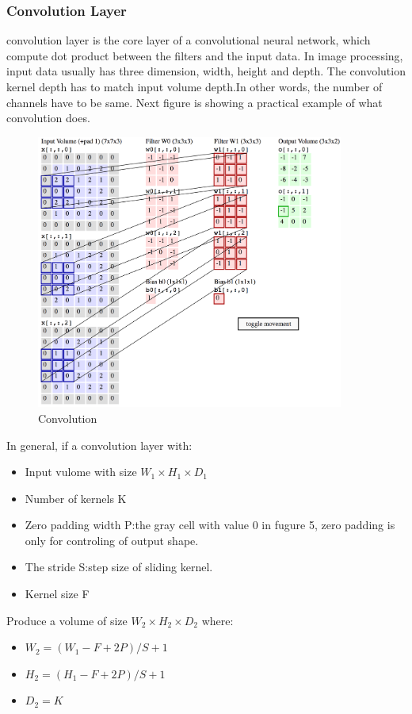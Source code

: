 \documentclass[12pt,a4paper]{report}
\begin{document}
\subsubsection{Convolution Layer}
convolution layer is the core layer of a convolutional neural network, which compute dot product between the filters and the input data. In image processing, input data usually has three dimension, width, height and depth. The convolution kernel depth has to match input volume	depth.In other words, the number of channels have to be same.	Next figure is showing a practical example of what convolution does.	
\begin{figure}[h]
\centering
\includegraphics[width=0.9\textwidth]{conv.png}
\caption{Convolution}
\end{figure}

In general, if a convolution layer with:
\begin{itemize}
\item Input vulome with size $W_1\times H_1\times D_1$
\item Number of kernels K
\item Zero padding width P:the gray cell with value 0 in fugure 5, zero padding is only for controling of output shape.
\item The stride S:step size of sliding kernel.
\item Kernel size F
\end{itemize}

Produce a volume of size $W_2 \times H_2 \times D_2$ where:
\begin{itemize}
\item $W_2=(W_1-F+2P)/S+1$
\item $H_2=(H_1-F+2P)/S+1$
\item $D_2=K$
\end{itemize}
\end{document}
